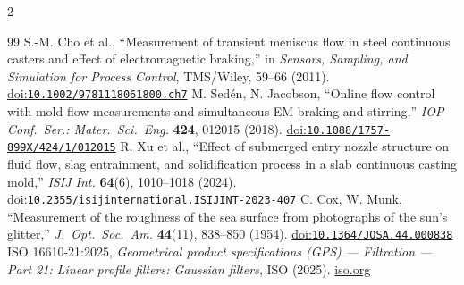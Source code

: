 \documentclass[10pt,letterpaper]{article}
\newcommand{\doi}[1]{\href{https://doi.org/#1}{doi:\nolinkurl{#1}}}
\begin{document}
\begin{multicols}{2}
\begin{thebibliography}{99}
 S.-M. Cho et al., ``Measurement of transient meniscus flow in steel continuous casters and effect of electromagnetic braking,'' in \emph{Sensors, Sampling, and Simulation for Process Control}, TMS/Wiley, 59--66 (2011). \doi{10.1002/9781118061800.ch7}
 M. Sedén, N. Jacobson, ``Online flow control with mold flow measurements and simultaneous EM braking and stirring,'' \emph{IOP Conf.\ Ser.: Mater.\ Sci.\ Eng.} \textbf{424}, 012015 (2018). \doi{10.1088/1757-899X/424/1/012015}
 R. Xu et al., ``Effect of submerged entry nozzle structure on fluid flow, slag entrainment, and solidification process in a slab continuous casting mold,'' \emph{ISIJ Int.} \textbf{64}(6), 1010--1018 (2024). \doi{10.2355/isijinternational.ISIJINT-2023-407}
 C. Cox, W. Munk, ``Measurement of the roughness of the sea surface from photographs of the sun's glitter,'' \emph{J.\ Opt.\ Soc.\ Am.} \textbf{44}(11), 838--850 (1954). \doi{10.1364/JOSA.44.000838}
 ISO 16610-21:2025, \emph{Geometrical product specifications (GPS) --- Filtration --- Part 21: Linear profile filters: Gaussian filters}, ISO (2025). \href{https://www.iso.org/standard/84786.html}{iso.org}
\end{thebibliography}
\end{multicols}
\end{document}
